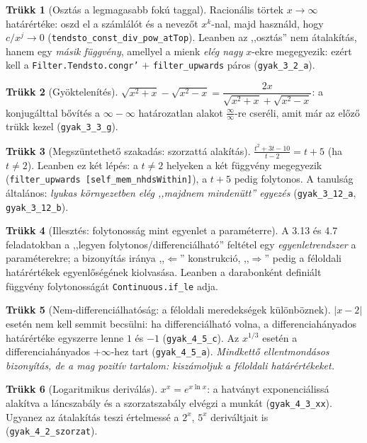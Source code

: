 \documentclass[11pt,a4paper]{article}
\newcommand{\lean}[1]{\texttt{\small #1}}
\theoremstyle{definition}
\newtheorem{trukk}{Trükk}
\begin{document}
\begin{trukk}[Osztás a legmagasabb fokú taggal]
Racionális törtek $x\to\infty$ határértéke: oszd el a számlálót és a nevezőt
$x^k$-nal, majd használd, hogy $c/x^j \to 0$
(\lean{tendsto\_const\_div\_pow\_atTop}). Leanben az ,,osztás'' nem
átalakítás, hanem egy \emph{másik függvény}, amellyel a mienk
\emph{elég nagy} $x$-ekre megegyezik: ezért kell a
\lean{Filter.Tendsto.congr'} $+$ \lean{filter\_upwards} páros
(\lean{gyak\_3\_2\_a}).
\end{trukk}

\begin{trukk}[Gyöktelenítés]
$\sqrt{x^2+x}-\sqrt{x^2-x} = \dfrac{2x}{\sqrt{x^2+x}+\sqrt{x^2-x}}$: a
konjugálttal bővítés a $\infty-\infty$ határozatlan alakot $\frac{\infty}{\infty}$-re
cseréli, amit már az előző trükk kezel (\lean{gyak\_3\_3\_g}).
\end{trukk}

\begin{trukk}[Megszüntethető szakadás: szorzattá alakítás]
$\frac{t^2+3t-10}{t-2} = t+5$ (ha $t\ne2$). Leanben ez két lépés: a
$t\ne2$ helyeken a két függvény megegyezik (\lean{filter\_upwards
[self\_mem\_nhdsWithin]}), a $t+5$ pedig folytonos. A tanulság általános:
\emph{lyukas környezetben elég ,,majdnem mindenütt'' egyezés}
(\lean{gyak\_3\_12\_a}, \lean{gyak\_3\_12\_b}).
\end{trukk}

\begin{trukk}[Illesztés: folytonosság mint egyenlet a paraméterre]
A 3.13 és 4.7 feladatokban a ,,legyen folytonos/differenciálható'' feltétel
egy \emph{egyenletrendszer} a paraméterekre; a bizonyítás iránya
,,$\Leftarrow$'' konstrukció, ,,$\Rightarrow$'' pedig a féloldali határértékek
egyenlőségének kiolvasása. Leanben a darabonként definiált függvény
folytonosságát \lean{Continuous.if\_le} adja.
\end{trukk}

\begin{trukk}[Nem-differenciálhatóság: a féloldali meredekségek különböznek]
$|x-2|$ esetén nem kell semmit becsülni: ha differenciálható volna, a
differenciahányados határértéke egyszerre lenne $1$ és $-1$
(\lean{gyak\_4\_5\_c}). Az $x^{1/3}$ esetén a differenciahányados
$+\infty$-hez tart (\lean{gyak\_4\_5\_a}). \emph{Mindkettő ellentmondásos
bizonyítás, de a mag pozitív tartalom: kiszámoljuk a féloldali határértékeket.}
\end{trukk}

\begin{trukk}[Logaritmikus deriválás]
$x^x = e^{x\ln x}$: a hatványt exponenciálissá alakítva a láncszabály és a
szorzatszabály elvégzi a munkát (\lean{gyak\_4\_3\_xx}). Ugyanez az
átalakítás teszi értelmessé a $2^x$, $5^x$ deriváltjait is
(\lean{gyak\_4\_2\_szorzat}).
\end{trukk}
\end{document}
